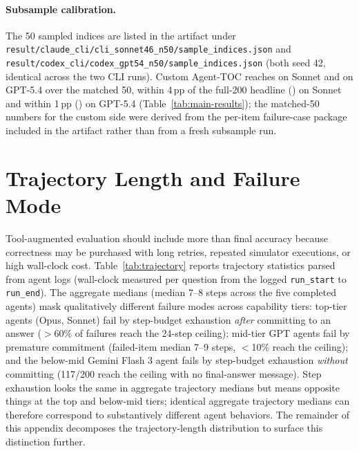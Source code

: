 \documentclass{article}
\begin{document}
\paragraph{Subsample calibration.}
The 50 sampled indices are listed in the artifact under \texttt{result/claude\_cli/cli\_sonnet46\_n50/sample\_indices.json} and \texttt{result/codex\_cli/codex\_gpt54\_n50/sample\_indices.json} (both seed 42, identical across the two CLI runs). Custom Agent-TOC reaches \SDKCustomTOCAcc{} on Sonnet and \GPTFiveFourCustomTOCMatchedAcc{} on GPT-5.4 over the matched 50, within 4\,pp of the full-200 headline (\SonnetTOC) on Sonnet and within 1\,pp (\GPTFiveFourTOC) on GPT-5.4 (Table~\ref{tab:main-results}); the matched-50 numbers for the custom side were derived from the per-item failure-case package included in the artifact rather than from a fresh subsample run.

\section{Trajectory Length and Failure Mode}
\label{sec:appendix-trajectory}

Tool-augmented evaluation should include more than final accuracy because correctness may be purchased with long retries, repeated simulator executions, or high wall-clock cost. Table~\ref{tab:trajectory} reports trajectory statistics parsed from agent logs (wall-clock measured per question from the logged \texttt{run\_start} to \texttt{run\_end}). The aggregate medians (median 7--8 steps across the five completed agents) mask qualitatively different failure modes across capability tiers: top-tier agents (Opus, Sonnet) fail by step-budget exhaustion \emph{after} committing to an answer ($>$60\% of failures reach the 24-step ceiling); mid-tier GPT agents fail by premature commitment (failed-item median 7--9 steps, $<$10\% reach the ceiling); and the below-mid Gemini Flash 3 agent fails by step-budget exhaustion \emph{without} committing (117/200 reach the ceiling with no final-answer message). Step exhaustion looks the same in aggregate trajectory medians but means opposite things at the top and below-mid tiers; identical aggregate trajectory medians can therefore correspond to substantively different agent behaviors. The remainder of this appendix decomposes the trajectory-length distribution to surface this distinction further.
\end{document}
